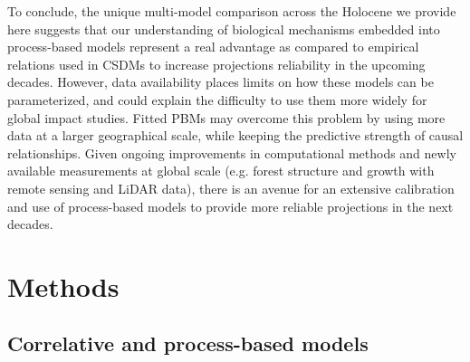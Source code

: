 \documentclass[pdflatex, sn-nature]{sn-jnl}%
\begin{document}
To conclude, the unique multi-model comparison across the Holocene we provide here suggests that our understanding of biological mechanisms embedded into process-based models represent a real advantage as compared to empirical relations used in CSDMs to increase projections reliability in the upcoming decades. However, data availability places limits on how these models can be parameterized, and could explain the difficulty to use them more widely for global impact studies. Fitted PBMs may overcome this problem by using more data at a larger geographical scale, while keeping the predictive strength of causal relationships. Given ongoing improvements in computational methods and newly available measurements at global scale (e.g. forest structure and growth with remote sensing and LiDAR data), there is an avenue for an extensive calibration and use of process-based models to provide more reliable projections in the next decades.

\section{Methods}\label{methods}

\subsection{Correlative and process-based models}\label{models}
\end{document}
